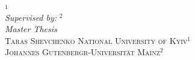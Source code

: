 \begin{titlepage}
  \vspace*{5cm}
  \makeatletter
  \begin{center}
    \begin{Huge}
      \@title
    \end{Huge}\\
    \vspace{2cm}
      \@author${}^{1}$ \\
    \vspace{0.5cm}
      \emph{Supervised by: } \@subtitle${}^{2}$\\
    \vfill
    \textit{Master Thesis}\\
      \textsc{Taras Shevchenko National University of Kyiv${}^{1}$ \\ Johannes Gutenbergr-Universität Mainz${}^{2}$}
  \end{center}
  \makeatother
\end{titlepage}
